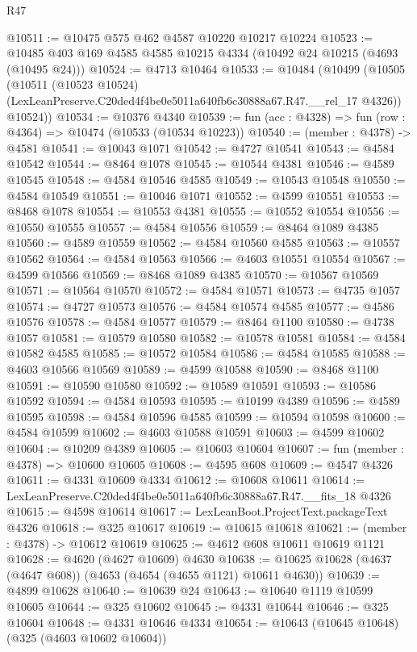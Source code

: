 \begin{lexlean}{R47}
\begin{coremodule}
@10511 := @10475 @575 @462 @4587 @10220 @10217 @10224
@10523 := @10485 @403 @169 @4585 @4585 @10215 @4334 (@10492 @24 @10215 (@4693 (@10495 @24)))
@10524 := @4713 @10464
@10533 := @10484
    (@10499
      (@10505
        (@10511
          (@10523 @10524)
          (LexLeanPreserve.C20ded4f4be0e5011a640fb6c30888a67.R47.__rel_17 @4326))
        @10524))
@10534 := @10376 @4340
@10539 := fun (acc : @4328) => fun (row : @4364) => @10474 (@10533 (@10534 @10223))
@10540 := (member : @4378) -> @4581
@10541 := @10043 @1071
@10542 := @4727 @10541
@10543 := @4584 @10542
@10544 := @8464 @1078
@10545 := @10544 @4381
@10546 := @4589 @10545
@10548 := @4584 @10546 @4585
@10549 := @10543 @10548
@10550 := @4584 @10549
@10551 := @10046 @1071
@10552 := @4599 @10551
@10553 := @8468 @1078
@10554 := @10553 @4381
@10555 := @10552 @10554
@10556 := @10550 @10555
@10557 := @4584 @10556
@10559 := @8464 @1089 @4385
@10560 := @4589 @10559
@10562 := @4584 @10560 @4585
@10563 := @10557 @10562
@10564 := @4584 @10563
@10566 := @4603 @10551 @10554
@10567 := @4599 @10566
@10569 := @8468 @1089 @4385
@10570 := @10567 @10569
@10571 := @10564 @10570
@10572 := @4584 @10571
@10573 := @4735 @1057
@10574 := @4727 @10573
@10576 := @4584 @10574 @4585
@10577 := @4586 @10576
@10578 := @4584 @10577
@10579 := @8464 @1100
@10580 := @4738 @1057
@10581 := @10579 @10580
@10582 := @10578 @10581
@10584 := @4584 @10582 @4585
@10585 := @10572 @10584
@10586 := @4584 @10585
@10588 := @4603 @10566 @10569
@10589 := @4599 @10588
@10590 := @8468 @1100
@10591 := @10590 @10580
@10592 := @10589 @10591
@10593 := @10586 @10592
@10594 := @4584 @10593
@10595 := @10199 @4389
@10596 := @4589 @10595
@10598 := @4584 @10596 @4585
@10599 := @10594 @10598
@10600 := @4584 @10599
@10602 := @4603 @10588 @10591
@10603 := @4599 @10602
@10604 := @10209 @4389
@10605 := @10603 @10604
@10607 := fun (member : @4378) => @10600 @10605
@10608 := @4595 @608
@10609 := @4547 @4326
@10611 := @4331 @10609 @4334
@10612 := @10608 @10611
@10614 := LexLeanPreserve.C20ded4f4be0e5011a640fb6c30888a67.R47.__fits_18 @4326
@10615 := @4598 @10614
@10617 := LexLeanBoot.ProjectText.packageText @4326
@10618 := @325 @10617
@10619 := @10615 @10618
@10621 := (member : @4378) -> @10612 @10619
@10625 := @4612 @608 @10611 @10619 @1121
@10628 := @4620 (@4627 @10609) @4630
@10638 := @10625 @10628 (@4637 (@4647 @608)) (@4653 (@4654 (@4655 @1121) @10611 @4630))
@10639 := @4899 @10628
@10640 := @10639 @24
@10643 := @10640 @1119 @10599 @10605
@10644 := @325 @10602
@10645 := @4331 @10644
@10646 := @325 @10604
@10648 := @4331 @10646 @4334
@10654 := @10643 (@10645 @10648) (@325 (@4603 @10602 @10604))

\end{coremodule}
\end{lexlean}
